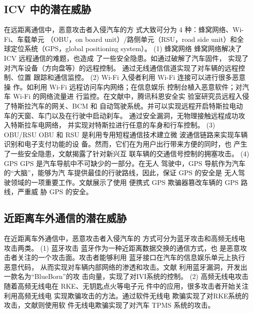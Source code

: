 \subsection{ICV 中的潜在威胁}
在远距离通信中，恶意攻击者入侵汽车的方
式大致可分为 4 种：蜂窝网络、Wi-Fi、车载单元
（OBU，on board unit）/路侧单元（RSU，road side
unit）和全球定位系统（GPS，global positioning
system）。
\newline
(1) 蜂窝网络
蜂窝网络解决了 ICV 远程通信的难题，也造成
了一些安全隐患。如通过破解了汽车固件，
实现了对汽车设备（方向盘等）的远程控制。
通过无线通信信道实现了对车辆的远程控制、位置
跟踪和通信监控。
\newline
(2) Wi-Fi
入侵者利用 Wi-Fi 连接可以进行很多恶意操
作。如利用 Wi-Fi 远程访问车内网络；在信息娱乐
控制台植入恶意软件；对汽车 Wi-Fi 的网络流量进
行监控。在文献\cite{keen}中，腾讯科恩安全实
验室研究员远程入侵了特斯拉汽车的网关、BCM 和
自动驾驶系统。并可以实现远程开启特斯拉电动车的天窗、车门以及在行驶中启动刹车。
通过安全漏洞，无物理接触远程成功攻入特斯拉车电网络，
并实现对特斯拉进行任意的车身和行车控制。
\newline
(3) OBU/RSU
OBU 和 RSU 是利用专用短程通信技术建立微
波通信链路来实现车辆识别和电子支付功能的设
备。然而，它们在为用户出行带来方便的同时，也
产生了一些安全隐患，文献\cite{yongsai}揭露了针对新兴互
联车辆的交通信号控制的拥塞攻击。
\newline
(4) GPS
GPS 是汽车导航中不可缺少的一部分。在无人
驾驶中，GPS 导航作为汽车的“大脑”，能够为汽
车提供最佳的行驶路线，因此，保证 GPS 的安全是
无人驾驶领域的一项重要工作。文献\cite{cuigai}展示了使用
便携式 GPS 欺骗器篡改车辆的 GPS 路线，严重威
胁 GPS 的安全。
\subsection{近距离车外通信的潜在威胁}
在近距离车外通信中，恶意攻击者入侵汽车的
方式可分为蓝牙攻击和高频无线电攻击两类。
\newline
(1) 蓝牙攻击
蓝牙作为一种近距离数据交换的通信方式，也
是恶意攻击者关注的一个攻击面。攻击者能够利用
蓝牙接口在汽车的信息娱乐单元上执行恶意代码，
从而实现对车辆内部网络的渗透和攻击。文献\cite{antian}
利用蓝牙漏洞，开发出一款名为“BlueBorn”的攻
击向量，实现了对IVI系统的控制。
\newline
(2) 高频无线电攻击
随着高频无线电在 RKE、无钥匙点火等电子元
件中的应用，很多攻击者开始关注利用高频无线电
实现欺骗攻击的方法。通过软件无线电
欺骗实现了对RKE系统的攻击，文献\cite{wuxiandian}则使用软
件无线电欺骗实现了对汽车 TPMS 系统的攻击。

